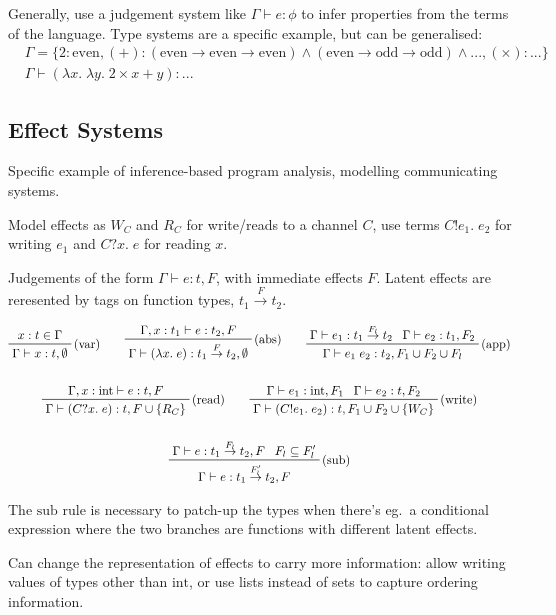 \documentclass[a4paper, 11pt]{article}
\begin{document}
{
    Generally, use a judgement system like \(\Gamma\vdash e : \phi\) to infer properties from the terms of the language. Type systems are a specific example, but can be generalised:
    \begin{align*}
    & \Gamma = \{2 : \text{even}, (+) : (\text{even}\rightarrow\text{even}\rightarrow\text{even}) \wedge (\text{even}\rightarrow\text{odd}\rightarrow\text{odd}) \wedge ..., (\times) : ...\} \\
    & \Gamma\vdash (\lambda x.\;\lambda y.\;2 \times x + y) : ...
    \end{align*}

    \subsection*{Effect Systems}
    {
        Specific example of inference-based program analysis, modelling communicating systems.

        Model effects as \(W_C\) and \(R_C\) for write/reads to a channel \(C\), use terms \(C!e_1.\;e_2\) for writing \(e_1\) and \(C?x.\;e\) for reading \(x\).

        Judgements of the form \(\Gamma\vdash e : t, F\), with immediate effects \(F\). Latent effects are reresented by tags on function types, \(t_1 \stackrel{F}{\rightarrow} t_2\).

        \begin{gather*}
        \prftree[r]{(var)}
        {x:t \in \Gamma}
        {\Gamma\vdash x : t,\emptyset}
        \qquad
        \prftree[r]{(abs)}
        {\Gamma,x:t_1\vdash e : t_2,F}
        {\Gamma\vdash (\lambda x.\;e) : t_1 \stackrel{F}{\rightarrow} t_2,\emptyset}
        \qquad
        \prftree[r]{(app)}
        {\Gamma\vdash e_1 : t_1 \stackrel{F_l}{\rightarrow} t_2}
        {\Gamma\vdash e_2 : t_1, F_2}
        {\Gamma\vdash e_1\;e_2 : t_2, F_1 \cup F_2 \cup F_l}
        \\
        \\
        \prftree[r]{(read)}
        {\Gamma,x:\text{int}\vdash e : t, F}
        {\Gamma\vdash (C?x.\;e) : t, F \cup \{R_C\}}
        \qquad
        \prftree[r]{(write)}
        {\Gamma\vdash e_1 : \text{int}, F_1}
        {\Gamma\vdash e_2 : t, F_2}
        {\Gamma\vdash (C!e_1.\;e_2) : t, F_1 \cup F_2 \cup \{W_C\}}
        \\
        \\
        \prftree[r]{(sub)}
        {\Gamma\vdash e : t_1 \stackrel{F_l}{\rightarrow} t_2, F}
        {F_l \subseteq F_l'}
        {\Gamma\vdash e : t_1 \stackrel{F_l'}{\rightarrow} t_2, F}
        \end{gather*}

        The \(\text{sub}\) rule is necessary to patch-up the types when there's eg.\ a conditional expression where the two branches are functions with different latent effects.

        Can change the representation of effects to carry more information: allow writing values of types other than \(\text{int}\), or use lists instead of sets to capture ordering information.
    }
}
\end{document}
